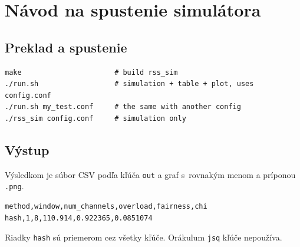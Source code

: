 \chapter{Návod na spustenie simulátora}
\label{app:manual}

\section*{Preklad a spustenie}
\begin{lstlisting}
make                      # build rss_sim
./run.sh                  # simulation + table + plot, uses config.conf
./run.sh my_test.conf     # the same with another config
./rss_sim config.conf     # simulation only
\end{lstlisting}

\section*{Výstup}
Výsledkom je súbor CSV podľa kľúča \texttt{out} a graf s~rovnakým menom a príponou \texttt{.png}.
\begin{lstlisting}
method,window,num_channels,overload,fairness,chi
hash,1,8,110.914,0.922365,0.0851074
\end{lstlisting}
Riadky \texttt{hash} sú priemerom cez všetky kľúče. Orákulum \texttt{jsq} kľúče nepoužíva.

